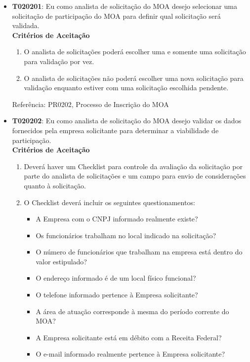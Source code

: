 \begin{itemize}
{\begin{itemize}
{\begin{enumerate}
				\end{enumerate}
				Referência: PR0201, Processo de Inscrição do MOA}
				\item{\textbf{T020201}: Eu como analista de solicitação do MOA desejo selecionar uma solicitação de participação do MOA para definir qual solicitação será validada.
				\\ \textbf{Critérios de Aceitação}
				\begin{enumerate}
					\item{O analista de solicitações poderá escolher uma e somente uma solicitação para validação por vez.}
					\item{O analista de solicitações não poderá escolher uma nova solicitação para validação enquanto estiver com uma solicitação escolhida pendente.}
				\end{enumerate}
				Referência: PR0202, Processo de Inscrição do MOA}
				\item{\textbf{T020202}: Eu como analista de solicitação do MOA desejo validar os dados fornecidos pela empresa solicitante para determinar a viabilidade de participação.
				\\ \textbf{Critérios de Aceitação}
				\begin{enumerate}
					\item{Deverá haver um Checklist para controle da avaliação da solicitação por parte do analista de solicitações e um campo para envio de considerações quanto à solicitação.}
					\item{O Checklist deverá incluir os seguintes questionamentos:
					\begin{itemize}
						\item{A Empresa com o CNPJ informado realmente existe?}
						\item{Os funcionários trabalham no local indicado na solicitação?}
						\item{O número de funcionários que trabalham na empresa está dentro do valor estipulado?}
						\item{O endereço informado é de um local físico funcional?}
						\item{O telefone informado pertence à Empresa solicitante?}
						\item{A área de atuação corresponde à mesma do período corrente do MOA?}
						\item{A Empresa solicitante está em débito com a Receita Federal?}
						\item{O e-mail informado realmente pertence à Empresa solicitante?}
 					\end{itemize}}

\end{enumerate}}
\end{itemize}}
\end{itemize}
